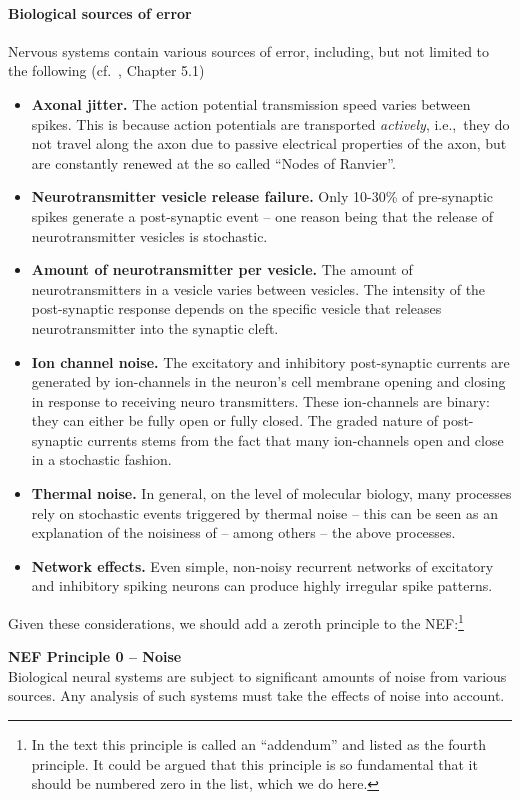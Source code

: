 \documentclass[10pt,letterpaper,oneside]{article}
\begin{document}
\paragraph{Biological sources of error}
Nervous systems contain various sources of error, including, but not limited to the following (cf.~\cite{gerstner2002spiking}, Chapter 5.1)
\begin{itemize}
	\item \textbf{Axonal jitter.}
	The action potential transmission speed varies between spikes. This is because action potentials are transported \emph{actively}, i.e.,~they do not travel along the axon due to passive electrical properties of the axon, but are constantly renewed at the so called \enquote{Nodes of Ranvier}.
	\item \textbf{Neurotransmitter vesicle release failure.}
	Only 10-30\% of pre-synaptic spikes generate a post-synaptic event -- one reason being that the release of neurotransmitter vesicles is stochastic.
	\item \textbf{Amount of neurotransmitter per vesicle.}
	The amount of neurotransmitters in a vesicle varies between vesicles. The intensity of the post-synaptic response depends on the specific vesicle that releases neurotransmitter into the synaptic cleft.
	\item \textbf{Ion channel noise.}
	The excitatory and inhibitory post-synaptic currents are generated by ion-channels in the neuron's cell membrane opening and closing in response to receiving neuro transmitters. These ion-channels are binary: they can either be fully open or fully closed. The graded nature of post-synaptic currents stems from the fact that many ion-channels open and close in a stochastic fashion.
	\item \textbf{Thermal noise.}
	In general, on the level of molecular biology, many processes rely on stochastic events triggered by thermal noise -- this can be seen as an explanation of the noisiness of -- among others -- the above processes.
	\item \textbf{Network effects.}
	Even simple, non-noisy recurrent networks of excitatory and inhibitory spiking neurons can produce highly irregular spike patterns.
\end{itemize}

Given these considerations, we should add a zeroth principle to the NEF:\footnote{In the text this principle is called an \enquote{addendum} and listed as the fourth principle. It could be argued that this principle is so fundamental that it should be numbered zero in the list, which we do here.}
\begin{mdframed}
	\textbf{NEF Principle 0 -- Noise}\\
	Biological neural systems are subject to significant amounts of noise from various sources. Any analysis of such systems must take the effects of noise into account.
\end{mdframed}
\end{document}
